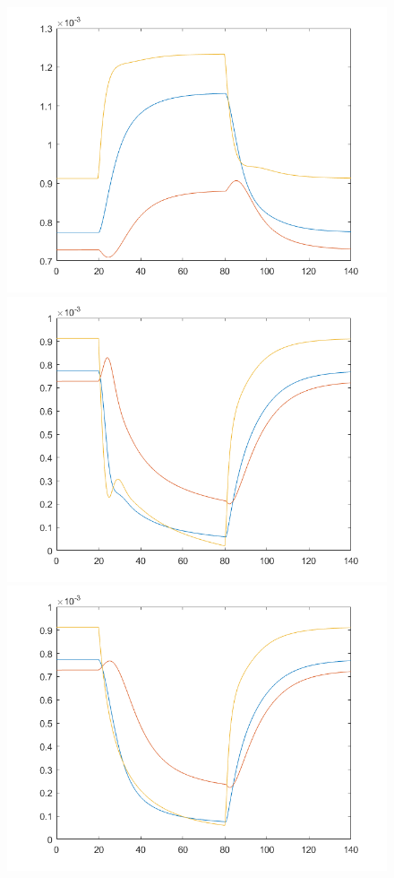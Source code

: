 \begin{figure}[h!]
\includegraphics[scale=0.3]{../a2.png}\hspace{0.01cm}
\includegraphics[scale=0.3]{../b2.png}\hspace{0.01cm}
\includegraphics[scale=0.3]{../c2.png}\\

\end{figure}
